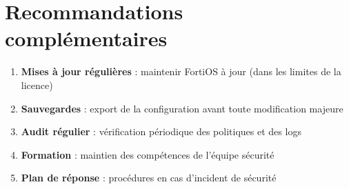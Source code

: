 \section{Recommandations complémentaires}

\begin{enumerate}
    \item \textbf{Mises à jour régulières} : maintenir FortiOS à jour (dans les limites de la licence)
    \item \textbf{Sauvegardes} : export de la configuration avant toute modification majeure
    \item \textbf{Audit régulier} : vérification périodique des politiques et des logs
    \item \textbf{Formation} : maintien des compétences de l'équipe sécurité
    \item \textbf{Plan de réponse} : procédures en cas d'incident de sécurité
\end{enumerate}
